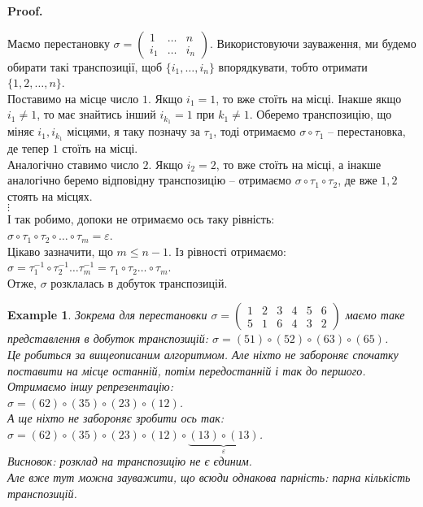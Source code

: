 \documentclass[a4paper, 10pt]{article}
\makeatletter
\theoremstyle{theoremdd}
\theoremstyle{theoremdd}
\theoremstyle{theoremdd}
\theoremstyle{theoremdd}
\theoremstyle{theoremdd}
\newtheorem{example}[theorem]{Example}
\theoremstyle{theoremdd}
\theoremstyle{theoremdd}
\theoremstyle{theoremdd}
\theoremstyle{theoremdd}
\theoremstyle{theoremdd}
\theoremstyle{theoremdd}
\theoremstyle{theoremdd}
\theoremstyle{theoremdd}
\theoremstyle{theoremdd}
\theoremstyle{theoremdd}
\renewenvironment{proof}[1][Proof.\\]{\par
\pushQED{\hfill \qed}%
\normalfont \topsep6\p@\@plus6\p@\relax
\trivlist
\item\relax
{\bfseries
#1\@addpunct{.}}\hspace\labelsep\ignorespaces
}{%
\popQED\endtrivlist\@endpefalse
}
\makeatother
\begin{document}
\begin{proof}
Маємо перестановку $\sigma = \begin{pmatrix}
1 & \dots & n \\
i_1 & \dots & i_n
\end{pmatrix}$. Використовуючи зауваження, ми будемо обирати такі транспозиції, щоб $\{i_1,\dots,i_n\}$ впорядкувати, тобто отримати $\{1,2,\dots,n\}$.\\
Поставимо на місце число $1$. Якщо $i_1 = 1$, то вже стоїть на місці. Інакше якщо $i_1 \neq 1$, то має знайтись інший $i_{k_1} = 1$ при $k_1 \neq 1$. Оберемо транспозицію, що міняє $i_1, i_{k_1}$ місцями, я таку позначу за $\tau_1$, тоді отримаємо $\sigma \circ \tau_1$ -- перестановка, де тепер $1$ стоїть на місці.\\
Аналогічно ставимо число $2$. Якщо $i_2 = 2$, то вже стоїть на місці, а інакше аналогічно беремо відповідну транспозицію -- отримаємо $\sigma \circ \tau_1 \circ \tau_2$, де вже $1,2$ стоять на місцях.\\
$\vdots$\\
І так робимо, допоки не отримаємо ось таку рівність:\\
$\sigma \circ \tau_1 \circ \tau_2 \circ \dots \circ \tau_m = \varepsilon$.\\
Цікаво зазначити, що $m \leq n-1$. Із рівності отримаємо:\\
$\sigma = \tau_1^{-1} \circ \tau_2^{-1} \dots \tau_{m}^{-1} = \tau_1 \circ \tau_2 \dots \circ \tau_m$.\\
Отже, $\sigma$ розклалась в добуток транспозицій. 
\end{proof}

\begin{example}
Зокрема для перестановки $\sigma = \begin{pmatrix}
1 & 2 & 3 & 4 & 5 & 6 \\
5 & 1 & 6 & 4 & 3 & 2
\end{pmatrix}$ маємо таке представлення в добуток транспозицій: $\sigma = (51) \circ (52) \circ (63) \circ (65)$.\\
Це робиться за вищеописаним алгоритмом. Але ніхто не забороняє спочатку поставити на місце останній, потім передостанній і так до першого. Отримаємо іншу репрезентацію:\\
$\sigma = (62) \circ (35) \circ (23) \circ (12)$.\\
А ще ніхто не забороняє зробити ось так:\\
$\sigma = (62) \circ (35) \circ (23) \circ (12) \circ \underbrace{(13) \circ (13)}_{\varepsilon}$.\\
Висновок: розклад на транспозицію не є єдиним.\\
Але вже тут можна зауважити, що всюди однакова парність: парна кількість транспозицій.
\end{example}
\end{document}
